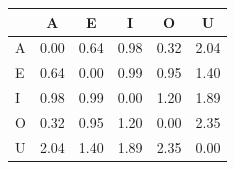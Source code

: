 \begin{tabular}{lccccc}
\toprule
\rowcolor{col01}
 & A & E & I & O & U \\
\midrule
A & 0.00 & 0.64 & 0.98 & 0.32 & 2.04 \\
E & 0.64 & 0.00 & 0.99 & 0.95 & 1.40 \\
I & 0.98 & 0.99 & 0.00 & 1.20 & 1.89 \\
O & 0.32 & 0.95 & 1.20 & 0.00 & 2.35 \\
U & 2.04 & 1.40 & 1.89 & 2.35 & 0.00 \\
\bottomrule
\end{tabular}
